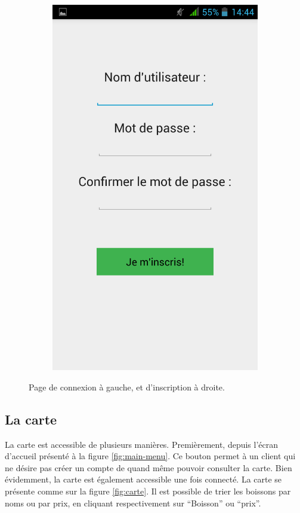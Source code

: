 \begin{figure}[H]
\begin{subfigure}
    \end{subfigure}%
    ~ 
    \begin{subfigure}
				\centering
				\includegraphics[scale=0.15]{img/register.png}
		\end{subfigure}
    \caption{Page de connexion à gauche, et d'inscription à droite.}
		\label{fig:register-login}
\end{figure}

\subsection{La carte}
La carte est accessible de plusieurs manières. Premièrement, depuis l'écran d'accueil
présenté à la figure \ref{fig:main-menu}. Ce bouton permet à un client qui ne désire
pas créer un compte de quand même pouvoir consulter la carte. Bien évidemment, la carte
est également accessible une fois connecté. La carte se présente comme sur la
figure \ref{fig:carte}. Il est possible de trier les boissons par noms ou par prix,
en cliquant respectivement sur ``Boisson'' ou ``prix''.

